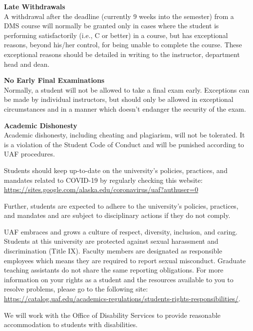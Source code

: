 \documentclass[12pt]{article}
\renewcommand{\emph}[1]{\textsf{\textbf{#1}}}
\newcommand{\localhead}[1]{\par\smallskip\textbf{#1}\nobreak\\}%
\def\subheading#1{\localhead{\emph{#1}}}
\begin{document}
\subheading{Late Withdrawals} 
A withdrawal after the deadline
  (currently 9 weeks into the semester) from a DMS course will
  normally be granted only in cases where the student is performing
  satisfactorily (i.e., C or better) in a course, but has exceptional
  reasons, beyond his/her control, for being unable to complete the
  course. These exceptional reasons should be detailed in writing to
  the instructor, department head and dean.

\subheading{No Early Final Examinations}
 Normally, a student will not be
  allowed to take a final exam early. Exceptions can be made by
  individual instructors, but should only be allowed in exceptional
  circumstances and in a manner which doesn't endanger the security of
  the exam.

\subheading{Academic Dishonesty}
Academic dishonesty, including cheating and plagiarism, will not
be tolerated.  It is a violation of the Student Code of Conduct
and will be punished according to UAF procedures.

 
  Students should keep up-to-date on the university's policies, practices, and mandates related to COVID-19 by regularly checking this website: \url{https://sites.google.com/alaska.edu/coronavirus/uaf?authuser=0}

Further, students are expected to adhere to the university's policies, practices, and mandates and are subject to disciplinary actions if they do not comply.

 UAF embraces and grows a culture of respect, diversity, inclusion, and caring. Students at this university are protected against sexual harassment and discrimination (Title IX). Faculty members are designated as responsible employees which means they are required to report sexual misconduct. Graduate teaching assistants do not share the same reporting obligations. For more information on your rights as a student and the resources available to you to resolve problems, please go to the following site: \url{https://catalog.uaf.edu/academics-regulations/students-rights-responsibilities/}.

 We will work with the Office of Disability Services to provide reasonable accommodation to students with disabilities.
\end{document}
